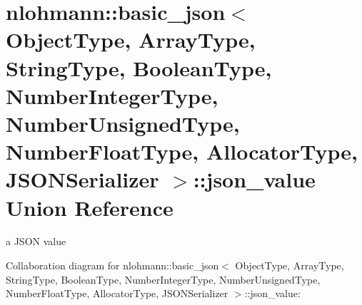 \hypertarget{unionnlohmann_1_1basic__json_1_1json__value}{}\section{nlohmann\+:\+:basic\+\_\+json$<$ Object\+Type, Array\+Type, String\+Type, Boolean\+Type, Number\+Integer\+Type, Number\+Unsigned\+Type, Number\+Float\+Type, Allocator\+Type, J\+S\+O\+N\+Serializer $>$\+:\+:json\+\_\+value Union Reference}
\label{unionnlohmann_1_1basic__json_1_1json__value}


a J\+S\+ON value  




Collaboration diagram for nlohmann\+:\+:basic\+\_\+json$<$ Object\+Type, Array\+Type, String\+Type, Boolean\+Type, Number\+Integer\+Type, Number\+Unsigned\+Type, Number\+Float\+Type, Allocator\+Type, J\+S\+O\+N\+Serializer $>$\+:\+:json\+\_\+value\+:
